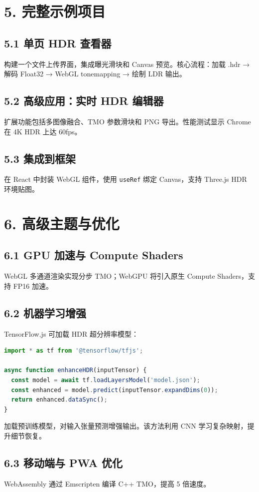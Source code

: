 \chapter{5. 完整示例项目}
\section{5.1 单页 HDR 查看器}
构建一个文件上传界面，集成曝光滑块和 Canvas 预览。核心流程：加载 .hdr → 解码 Float32 → WebGL tonemapping → 绘制 LDR 输出。\par
\section{5.2 高级应用：实时 HDR 编辑器}
扩展功能包括多图像融合、TMO 参数滑块和 PNG 导出。性能测试显示 Chrome 在 4K HDR 上达 60fps。\par
\section{5.3 集成到框架}
在 React 中封装 WebGL 组件，使用 \texttt{useRef} 绑定 Canvas，支持 Three.js HDR 环境贴图。\par
\chapter{6. 高级主题与优化}
\section{6.1 GPU 加速与 Compute Shaders}
WebGL 多通道渲染实现分步 TMO；WebGPU 将引入原生 Compute Shaders，支持 FP16 加速。\par
\section{6.2 机器学习增强}
TensorFlow.js 可加载 HDR 超分辨率模型：\par
\begin{lstlisting}[language=javascript]
import * as tf from '@tensorflow/tfjs';

async function enhanceHDR(inputTensor) {
  const model = await tf.loadLayersModel('model.json');
  const enhanced = model.predict(inputTensor.expandDims(0));
  return enhanced.dataSync();
}
\end{lstlisting}
加载预训练模型，对输入张量预测增强输出。该方法利用 CNN 学习复杂映射，提升细节恢复。\par
\section{6.3 移动端与 PWA 优化}
WebAssembly 通过 Emscripten 编译 C++ TMO，提高 5 倍速度。\par
